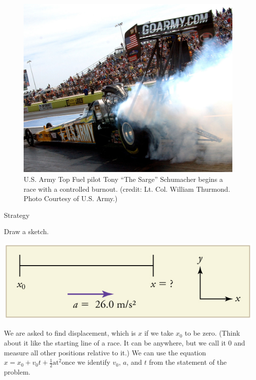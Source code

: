 \documentclass[
]{book}
\newenvironment{tinysection}{}{}
\begin{document}
\begin{figure}
\hypertarget{import-auto-id2356722}{%
\centering
\includegraphics{images/Figure_02_04_02.jpg}
\caption{U.S. Army Top Fuel pilot Tony ``The Sarge'' Schumacher begins a race
with a controlled burnout. (credit: Lt. Col. William Thurmond. Photo
Courtesy of U.S.
Army.)}\label{import-auto-id2356722}
}
\end{figure}

\begin{tinysection}

{Strategy}

\end{tinysection}

Draw a sketch.

\includegraphics{images/Figure_02_04_02a.jpg}

We are asked to find displacement, which is \(x\) if we take \(x_{0}{}\) to
be zero. (Think about it like the starting line of a race. It can be
anywhere, but we call it 0 and measure all other positions relative to
it.) We can use the equation
\({{x = {x_{0} + v_{0}}}{t + \frac{1}{2}}\text{at}^{2}}{}\)\emph{}once
we identify \(v_{0}{}\), \(a{}\), and \(t{}\) from the statement of the
problem.
\end{document}
